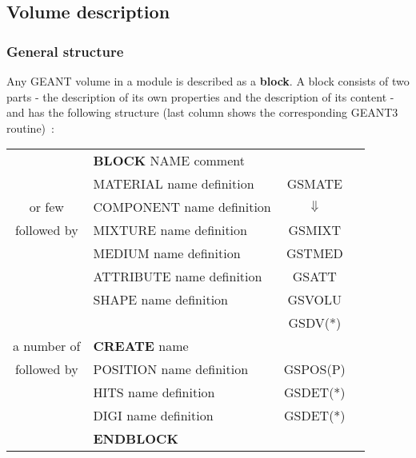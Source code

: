 
 
\subsection{Volume description}

\subsubsection{General structure}

Any  GEANT volume  in a module is described as a {\bf block}.
A block consists of two parts - the description of its own properties
and  the description of its content - and has the following structure
(last column shows the corresponding GEANT3 routine)~:
 
\begin{center}   \begin{tabular}{|cl||cl|}             \hline
           & {\bf BLOCK} NAME comment                &           & \\ %
           & \hspace{.5cm} MATERIAL  name definition & \s GSMATE & \\ 
or few     & \hspace{.5cm} COMPONENT name definition & $\Downarrow$ &  \\
followed by& \hspace{.5cm} MIXTURE   name definition & \s GSMIXT & \\
           & \hspace{.5cm} MEDIUM    name definition & \s GSTMED & \\
           & \hspace{.5cm} ATTRIBUTE name definition & \s GSATT  & \\
           & \hspace{.5cm} SHAPE     name definition & \s GSVOLU & \\  
           & \hspace{.5cm}                           & \s GSDV(*)& \\ \hline
a number of& \hspace{.5cm} {\bf CREATE}  name        & & \\ %
followed by& \hspace{.5cm} POSITION  name definition & \s GSPOS(P)& \\ %
           & \hspace{.5cm} HITS      name definition & \s GSDET(*)& \\ %
           & \hspace{.5cm} DIGI      name definition & \s GSDET(*)& \\ %
           & {\bf ENDBLOCK}                          &            & \\   \hline
\end{tabular}   \end{center}
 
